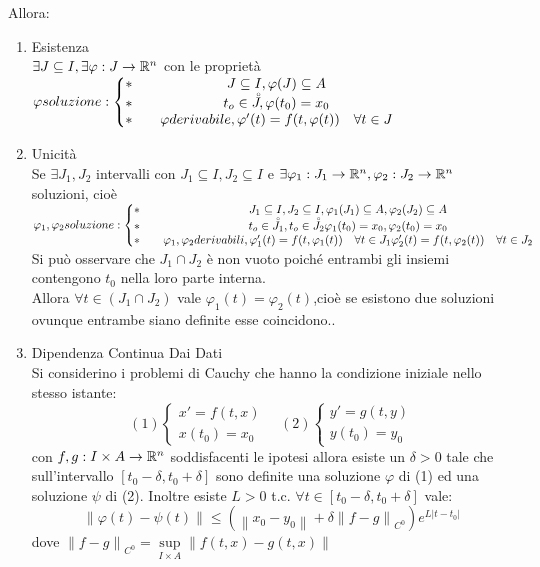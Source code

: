 Allora:
\begin{enumerate}
	\item Esistenza\\
	$\exists J\subseteq I, \exists\varphi : J \to \mathbb{R}^n$ con le proprietà\\
	$\varphi soluzione:
	\left\{
	\begin{matrix}
	\ast && J\subseteq I, \varphi(J)\subseteq{A}\\
	\ast && t_o\in\accentset{\circ}{J}, \varphi(t_0)=x_0\\
	\ast && \varphi derivabile,  \varphi'(t)=f(t,\varphi(t)) \quad\forall t\in J\end{matrix}\right.$
	\item Unicità\\
	Se $\exists J_1,J_2$ intervalli con $J_1\subseteq I,J_2\subseteq I$ e $\exists \varphi_1:J_1\to \mathbb{R}^n, \varphi_2:J_2\to \mathbb{R}^n$ soluzioni, cioè\\
	$\varphi_1,\varphi_2 soluzione:
	\left\{
	\begin{matrix}
	\ast && J_1\subseteq I,J_2\subseteq I, \varphi_1(J_1)\subseteq{A},\varphi_2(J_2)\subseteq{A}\\
	\ast && t_o\in\accentset{\circ}{J_1},t_o\in\accentset{\circ}{J_2} \varphi_1(t_0)=x_0, \varphi_2(t_0)=x_0\\
	\ast && \varphi_1,\varphi_2 derivabili,  \varphi_1'(t)=f(t,\varphi_1(t)) \quad\forall t\in J_1
	 \varphi_2'(t)=f(t,\varphi_2(t)) \quad\forall t\in J_2
	\end{matrix}\right.$
	Si può osservare che $J_1\cap J_2$ è non vuoto poiché entrambi gli insiemi contengono $t_0$ nella loro parte interna.\\
	Allora $\forall t \in(J_1\cap J_2)$ vale $\varphi_1(t)=\varphi_2(t)$,cioè se esistono due soluzioni ovunque entrambe siano definite esse coincidono..\\
	\item Dipendenza Continua Dai Dati\\
	Si considerino i problemi di Cauchy che hanno la condizione iniziale nello stesso istante:
	$$ 
	(1)\left\{
	\begin{matrix}
	 x'=f(t,x)\\x(t_0)=x_0
	\end{matrix}
	\right.\quad
	(2)\left\{
	\begin{matrix}
	 y'=g(t,y)\\y(t_0)=y_0
	\end{matrix}
	\right.
	$$
	con $f,g:I\times A \to \mathbb{R}^n$ soddisfacenti le ipotesi allora esiste un $\delta >0$ tale che sull'intervallo $\left[ t_0-\delta,t_0+\delta \right]$ sono definite una soluzione $\varphi$ di (1) ed una soluzione $\psi$ di (2). Inoltre esiste $L>0$ t.c. $\forall t\in \left[t_0-\delta,t_0+\delta\right]$ vale:
	$$ 
	\left\| \varphi(t)-\psi(t) \right\| 
	\le 
	(\left\| x_0-y_0 \right\|+\delta\left\| f-g \right\|_{C^0})e^{L|t-t_0|}  
	$$
	dove $\left\| f-g \right\|_{C^0}=\sup\limits_{I\times A}\left\|f(t,x)-g(t,x)\right\|$
\end{enumerate}
